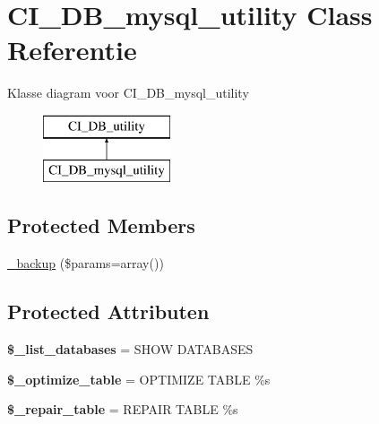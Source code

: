 \hypertarget{class_c_i___d_b__mysql__utility}{}\section{C\+I\+\_\+\+D\+B\+\_\+mysql\+\_\+utility Class Referentie}
\label{class_c_i___d_b__mysql__utility}
Klasse diagram voor C\+I\+\_\+\+D\+B\+\_\+mysql\+\_\+utility\begin{figure}[H]
\begin{center}
\leavevmode
\includegraphics[height=2.000000cm]{class_c_i___d_b__mysql__utility}
\end{center}
\end{figure}
\subsection*{Protected Members}
\begin{DoxyCompactItemize}
\item 
\mbox{\hyperlink{class_c_i___d_b__mysql__utility_a30f3053d2c82e7562349924363507afa}{\+\_\+backup}} (\$params=array())
\end{DoxyCompactItemize}
\subsection*{Protected Attributen}
\begin{DoxyCompactItemize}
\item 
\mbox{\label{class_c_i___d_b__mysql__utility_afe3a5b80562d93d6bc7e2b53c95b7e5a}} 
{\bfseries \$\+\_\+list\+\_\+databases} = \textquotesingle{}S\+H\+OW D\+A\+T\+A\+B\+A\+S\+ES\textquotesingle{}
\item 
\mbox{\label{class_c_i___d_b__mysql__utility_a083199e5c22c78912dae0a47bb2d7fad}} 
{\bfseries \$\+\_\+optimize\+\_\+table} = \textquotesingle{}O\+P\+T\+I\+M\+I\+ZE T\+A\+B\+LE \%s\textquotesingle{}
\item 
\mbox{\label{class_c_i___d_b__mysql__utility_a5cf925cbd52e3f6ba5b7ada3fa436efc}} 
{\bfseries \$\+\_\+repair\+\_\+table} = \textquotesingle{}R\+E\+P\+A\+IR T\+A\+B\+LE \%s\textquotesingle{}
\end{DoxyCompactItemize}
